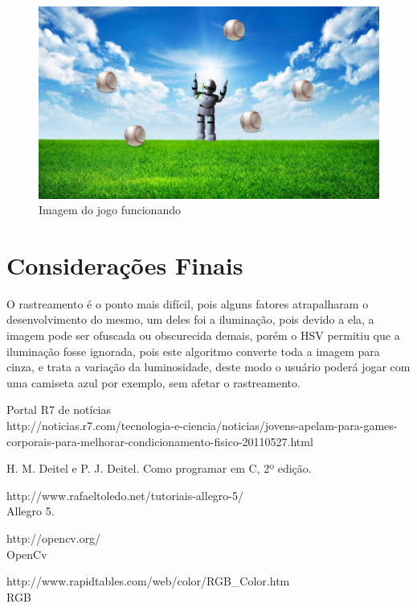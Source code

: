 \documentclass{sciposter}
\begin{document}
\begin{multicols}{3}
\begin{figure}[!htb]
\centering
\includegraphics[scale=0.7]{fundo.jpg}
\caption{Imagem do jogo funcionando}
\end{figure}

\section{Considerações Finais}

O rastreamento é o ponto mais difícil, pois alguns fatores atrapalharam o desenvolvimento do mesmo, um deles foi a iluminação, pois devido a ela, a imagem pode ser ofuscada ou obscurecida demais, porém o HSV permitiu que a iluminação fosse ignorada, pois este algoritmo converte toda a imagem para cinza, e trata a variação da luminosidade, deste modo o usuário poderá jogar com uma camiseta azul por exemplo, sem afetar o rastreamento.



\begin{thebibliography}{5}

  Portal R7 de notícias 
\\
\newblock http://noticias.r7.com/tecnologia-e-ciencia/noticias/jovens-apelam-para-games-corporais-para-melhorar-condicionamento-fisico-20110527.html


H. M. Deitel e P. J. Deitel.
\newblock Como programar em C, 2º edição.

 http://www.rafaeltoledo.net/tutoriais-allegro-5/
\\
\newblock Allegro 5.

 http://opencv.org/
\\
\newblock OpenCv

 http://www.rapidtables.com/web/color/RGB\_Color.htm \\
\newblock RGB


\end{thebibliography}

\end{multicols}
\end{document}
